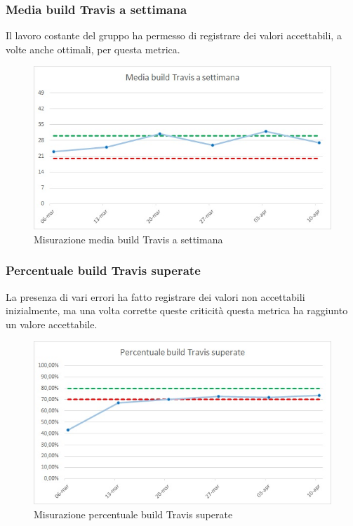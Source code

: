 \subsubsection{Media build Travis a settimana}
Il lavoro costante del gruppo ha permesso di registrare dei valori accettabili, a volte anche ottimali, per questa metrica.
\begin{figure} [H]
	\centering
	\includegraphics[scale=1]{Img/build}
	\caption{Misurazione media build Travis a settimana}\label{}
\end{figure}

\subsubsection{Percentuale build Travis superate}
La presenza di vari errori ha fatto registrare dei valori non accettabili inizialmente, ma una volta corrette queste criticità questa metrica ha raggiunto un valore accettabile.
\begin{figure} [H]
	\centering
	\includegraphics[scale=1]{Img/buildPass}
	\caption{Misurazione percentuale build Travis superate}\label{}
\end{figure}

